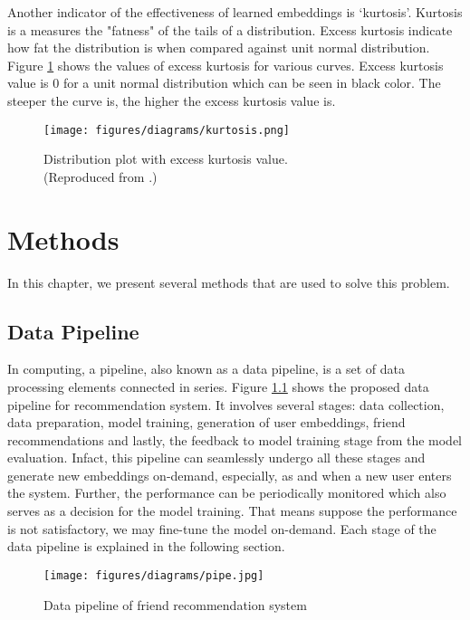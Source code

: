 \documentclass{kththesis}
\begin{document}
Another indicator of the effectiveness of learned embeddings is `kurtosis'. Kurtosis is a measures the "fatness"  of the tails of a distribution. Excess kurtosis indicate how fat the distribution is when compared against unit normal distribution. Figure  \ref{fig:kurt} shows the values of excess kurtosis for various curves. Excess kurtosis value is 0 for a unit normal distribution which can be seen in black color. The steeper the curve is, the higher the excess kurtosis value is.

\begin{figure}[h!]
\centering
\captionsetup{justification=centering}
\texttt{[image: figures/diagrams/kurtosis.png]}
\caption{Distribution plot with excess kurtosis value. \\
(Reproduced from \cite{wkurt}.)}
\label{fig:kurt}
\end{figure}





\chapter{Methods}
In this chapter, we present several methods that are used to solve this problem.
\section{Data Pipeline}
In computing, a pipeline, also known as a data pipeline, is a set of data processing elements connected in series. Figure \ref{fig:pipe} shows the proposed data pipeline for recommendation system. It involves several stages: data collection, data preparation, model training, generation of user embeddings, friend recommendations and lastly, the feedback to model training stage from the model evaluation. Infact, this pipeline can seamlessly undergo all these stages and generate new embeddings on-demand, especially, as and when a new user enters the system. Further, the performance can be periodically monitored which also serves as a decision for the model training. That means suppose the performance is not satisfactory, we may fine-tune the model on-demand. Each stage of the data pipeline is explained in the following section.

\begin{figure}[h!]
\centering
\texttt{[image: figures/diagrams/pipe.jpg]}
\caption{Data pipeline of friend recommendation system}
\label{fig:pipe}
\end{figure}
\end{document}
